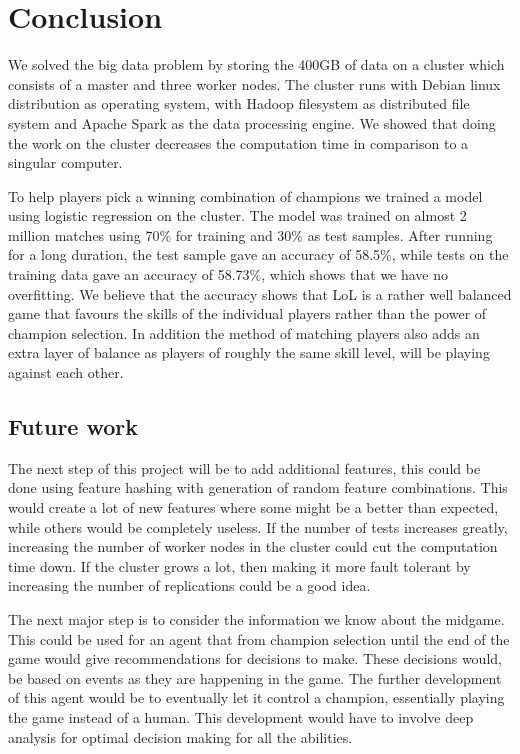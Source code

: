 \section{Conclusion}\label{sec:conclusion}
We solved the big data problem by storing the 400GB of data on a cluster which consists of a master and three worker nodes. The cluster runs with Debian linux distribution as operating system, with Hadoop filesystem as distributed file system and Apache Spark as the data processing engine. We showed that doing the work on the cluster decreases the computation time in comparison to a singular computer.

To help players pick a winning combination of champions we trained a model using logistic regression on the cluster. The model was trained on almost 2 million matches using 70\% for training and 30\% as test samples. After running for a long duration, the test sample gave an accuracy of 58.5\%, while tests on the training data gave an accuracy of 58.73\%, which shows that we have no overfitting. We believe that the accuracy shows that LoL is a rather well balanced game that favours the skills of the individual players rather than the power of champion selection. In addition the method of matching players also adds an extra layer of balance as players of roughly the same skill level, will be playing against each other.

\subsection{Future work}\label{sec:futurework}
The next step of this project will be to add additional features, this could be done using feature hashing with generation of random feature combinations. This would create a lot of new features where some might be a better than expected, while others would be completely useless.
If the number of tests increases greatly, increasing the number of worker nodes in the cluster could cut the computation time down. If the cluster grows a lot, then making it more fault tolerant by increasing the number of replications could be a good idea.

The next major step is to consider the information we know about the midgame. This could be used for an agent that from champion selection until the end of the game would give recommendations for decisions to make. These decisions would, be based on events as they are happening in the game. The further development of this agent would be to eventually let it control a champion, essentially playing the game instead of a human. This development would have to involve deep analysis for optimal decision making for all the abilities.




